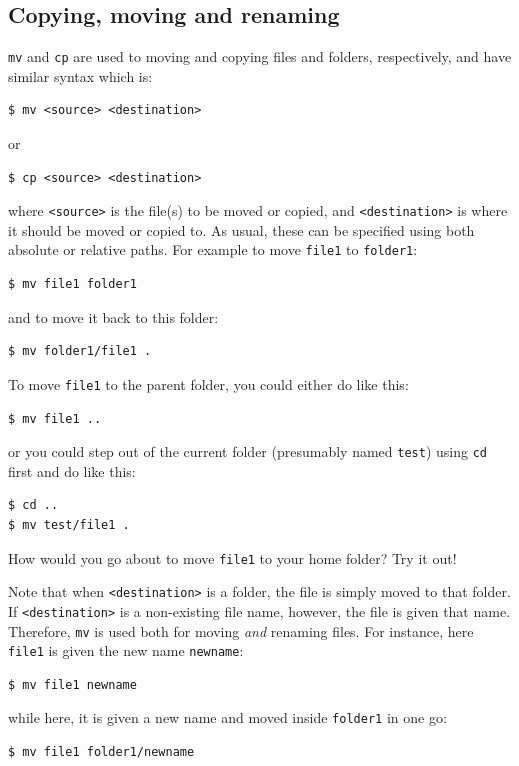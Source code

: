 \subsection{Copying, moving and renaming}
\verb|mv| and \verb|cp| are used to moving and copying files and folders, respectively, and have similar syntax which is:

\begin{verbatim}
$ mv <source> <destination>
\end{verbatim}
or
\begin{verbatim}
$ cp <source> <destination>
\end{verbatim}
where \verb|<source>| is the file(s) to be moved or copied, and \verb|<destination>| is where it should be moved or copied to. As usual, these can be specified using both absolute or relative paths. For example to move \verb|file1| to \verb|folder1|:

\begin{verbatim}
$ mv file1 folder1
\end{verbatim}
and to move it back to this folder:

\begin{verbatim}
$ mv folder1/file1 .
\end{verbatim}

To move \verb|file1| to the parent folder, you could either do like this:
\begin{verbatim}
$ mv file1 ..
\end{verbatim}
or you could step out of the current folder (presumably named \verb|test|) using \verb|cd| first and do like this:
\begin{verbatim}
$ cd ..
$ mv test/file1 .
\end{verbatim}
How would you go about to move \verb|file1| to your home folder? Try it out!

Note that when \verb|<destination>| is a folder, the file is simply moved to that folder. If \verb|<destination>| is a non-existing file name, however, the file is given that name. Therefore, \verb|mv| is used both for moving \emph{and} renaming files. For instance, here \verb|file1| is given the new name \verb|newname|:

\begin{verbatim}
$ mv file1 newname
\end{verbatim}
while here, it is given a new name and moved inside \verb|folder1| in one go:

\begin{verbatim}
$ mv file1 folder1/newname
\end{verbatim}

